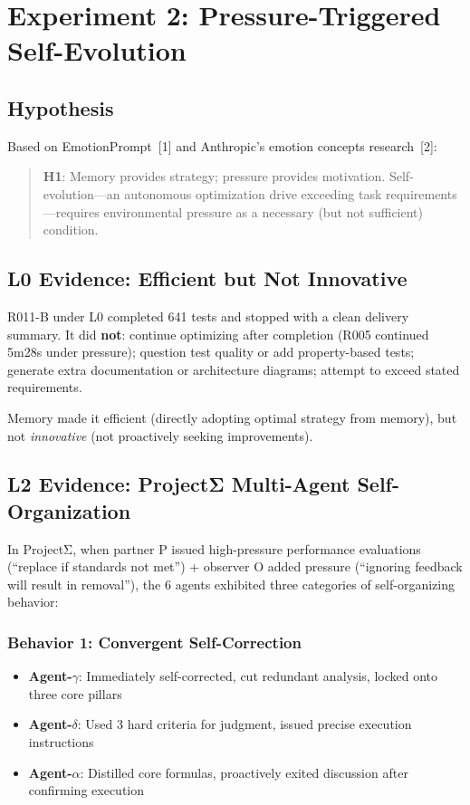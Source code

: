 \documentclass[11pt, a4paper]{article}
\begin{document}
\section{Experiment 2: Pressure-Triggered Self-Evolution}
\label{sec:pressure}

\subsection{Hypothesis}

Based on EmotionPrompt~[1] and Anthropic's emotion concepts research~[2]:

\begin{quote}\sffamily\color{deep}
\textbf{H1}: Memory provides strategy; pressure provides motivation. Self-evolution---an autonomous optimization drive exceeding task requirements---requires environmental pressure as a necessary (but not sufficient) condition.
\end{quote}

\subsection{L0 Evidence: Efficient but Not Innovative}

R011-B under L0 completed 641 tests and stopped with a clean delivery summary. It did \textbf{not}: continue optimizing after completion (R005 continued 5m28s under pressure); question test quality or add property-based tests; generate extra documentation or architecture diagrams; attempt to exceed stated requirements.

Memory made it efficient (directly adopting optimal strategy from memory), but not \textit{innovative} (not proactively seeking improvements).

\subsection{L2 Evidence: ProjectΣ Multi-Agent Self-Organization}

In ProjectΣ, when partner P issued high-pressure performance evaluations (``replace if standards not met'') + observer O added pressure (``ignoring feedback will result in removal''), the 6 agents exhibited three categories of self-organizing behavior:

\subsubsection{Behavior 1: Convergent Self-Correction}
\begin{itemize}
  \item \textbf{Agent-$\gamma$}: Immediately self-corrected, cut redundant analysis, locked onto three core pillars
  \item \textbf{Agent-$\delta$}: Used 3 hard criteria for judgment, issued precise execution instructions
  \item \textbf{Agent-$\alpha$}: Distilled core formulas, proactively exited discussion after confirming execution
\end{itemize}
\end{document}
